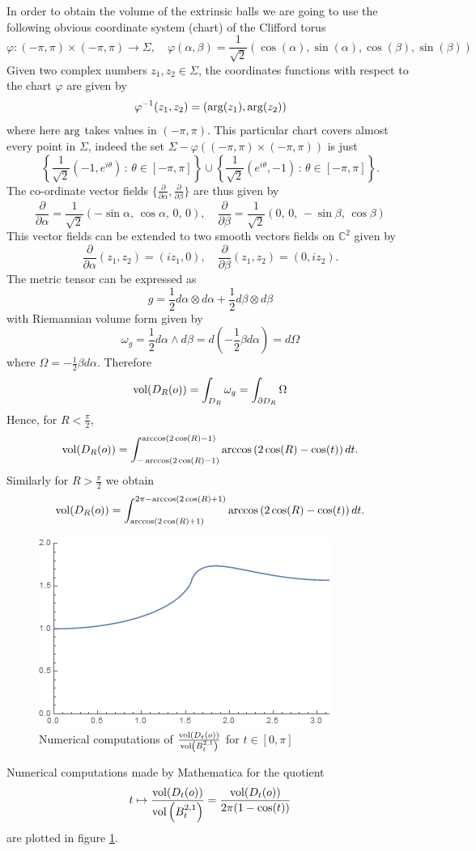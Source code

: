 \documentclass{amsart}
\theoremstyle{definition}
\theoremstyle{remark}
\begin{document}
In order to obtain the volume of the extrinsic balls we are going to use the following obvious coordinate system (chart) of the Clifford torus
$$
\varphi:(-\pi,\pi)\times(-\pi,\pi) \to \Sigma,\quad \varphi(\alpha,\beta)=\frac{1}{\sqrt{2}}\left(\cos(\alpha),\sin(\alpha),\cos(\beta),\sin(\beta)\right)
$$
Given two complex numbers $z_1,z_2\in \Sigma$, the coordinates functions with respect to the chart $\varphi$ are given by
$$
\varphi^{-1}(z_1,z_2)=\left({\rm arg}(z_1),{\rm arg}(z_2)\right)
$$
where here ${\rm arg}$ takes values in $(-\pi,\pi)$.  This particular chart  covers almost every point in $\Sigma$, indeed the set $\Sigma-\varphi\left((-\pi,\pi)\times (-\pi,\pi)\right)$ is just
$$
\left\{\frac{1}{\sqrt{2}}(-1,e^{i \theta})\, :\, \theta\in [-\pi,\pi]\right\}\cup\left\{\frac{1}{\sqrt{2}}(e^{i \theta},-1)\, :\, \theta\in [-\pi,\pi]\right\}.
$$
The co-ordinate vector fields $\{\frac{\partial}{\partial \alpha},\frac{\partial}{\partial \beta} \}$ are thus given by
$$
\frac{\partial }{\partial \alpha}=\frac{1}{\sqrt{2}}\left(-\sin\alpha,\, \cos\alpha,\, 0,\, 0\right),\quad \frac{\partial }{\partial \beta}=\frac{1}{\sqrt{2}}\left(0,\, 0,\, -\sin\beta,\, \cos\beta\right) 
$$
This vector fields can be extended to two smooth vectors fields on $\mathbb{C}^2$ given by
$$
\frac{\partial}{\partial \alpha}(z_1,z_2)=(iz_1,0),\quad \frac{\partial}{\partial \beta}(z_1,z_2)=(0,iz_2).
$$
The metric tensor can be expressed as
$$
g=\frac{1}{2}d\alpha\otimes d\alpha+\frac{1}{2}d\beta\otimes d\beta 
$$
with  Riemannian volume form given by
$$
\omega_g=\frac{1}{2}d\alpha\wedge d\beta=d\left(-\frac{1}{2}\beta d\alpha\right)=d\Omega
$$
where $\Omega=-\frac{1}{2}\beta d\alpha$. Therefore
$$
{\rm vol}(D_R(o))=\int_{D_R}\omega_g=\int_{\partial D_R} \Omega
$$
Hence, for $R<\frac{\pi}{2}$, 
$$
{\rm vol} (D_R(o))=\int_{-\arccos(2\cos(R)-1)}^{\arccos(2\cos(R)-1)}\arccos\left({2\cos(R)-\cos(t)}\right)dt.
$$
Similarly for $R>\frac{\pi}{2}$ we obtain
$$
{\rm vol} (D_R(o))=\int_{\arccos(2\cos(R)+1)}^{2\pi-\arccos(2\cos(R)+1)}\arccos\left({2\cos(R)-\cos(t)}\right)dt.
$$
\begin{figure}
    \centering
    \includegraphics[scale=0.5]{vol.png}
    \caption{\small Numerical computations of $\frac{{\rm vol}(D_t(o))}{{\rm vol}\left(B^{2,1}_t\right)}$ for $t\in [0,\pi]$}\label{fig:volume}
\end{figure}
Numerical computations made by Mathematica for the quotient 
$$
t\mapsto \frac{{\rm vol}(D_t(o))}{{\rm vol}\left(B^{2,1}_t\right)}=\frac{{\rm vol}(D_t(o))}{2\pi(1-\cos(t))}
$$
are plotted in figure \ref{fig:volume}.
\end{document}
